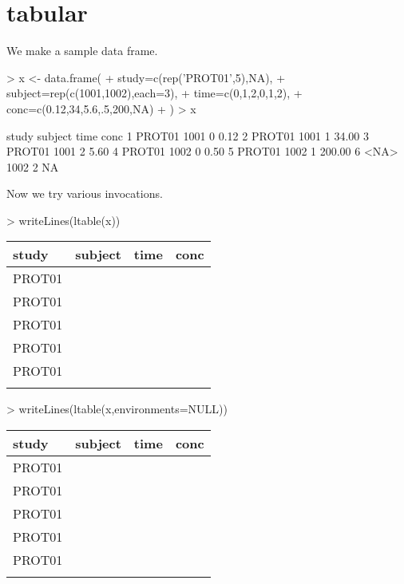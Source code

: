 \documentclass[titlepage]{article}
\begin{document}

\section*{tabular}
We make a sample data frame.
\begin{Schunk}
\begin{Sinput}
> x <- data.frame(
+   study=c(rep('PROT01',5),NA),
+   subject=rep(c(1001,1002),each=3),
+   time=c(0,1,2,0,1,2),
+   conc=c(0.12,34,5.6,.5,200,NA)
+ )
> x
\end{Sinput}
\begin{Soutput}
   study subject time   conc
1 PROT01    1001    0   0.12
2 PROT01    1001    1  34.00
3 PROT01    1001    2   5.60
4 PROT01    1002    0   0.50
5 PROT01    1002    1 200.00
6   <NA>    1002    2     NA
\end{Soutput}
\end{Schunk}
Now we try various invocations.
\begin{Schunk}
\begin{Sinput}
> writeLines(ltable(x))
\end{Sinput}
\begin{table}[!htpb]
 \begin{center}
  \begin{tabular}{lrrr}
    \hline \hline
   study & subject & time & conc \\ \hline
   PROT01 & \verb#1001# & \verb#0# & \verb#0.12# \\
   PROT01 & \verb#1001# & \verb#1# & \verb#34.00# \\
   PROT01 & \verb#1001# & \verb#2# & \verb#5.60# \\
   PROT01 & \verb#1002# & \verb#0# & \verb#0.50# \\
   PROT01 & \verb#1002# & \verb#1# & \verb#200.00# \\
    & \verb#1002# & \verb#2# & \verb## \\ \hline
  \end{tabular}
 \end{center}
\end{table}\end{Schunk}
\begin{Schunk}
\begin{Sinput}
> writeLines(ltable(x,environments=NULL))
\end{Sinput}
\begin{table}[!htpb]
 \begin{tabular}{lrrr}
   \hline \hline
  study & subject & time & conc \\ \hline
  PROT01 & \verb#1001# & \verb#0# & \verb#0.12# \\
  PROT01 & \verb#1001# & \verb#1# & \verb#34.00# \\
  PROT01 & \verb#1001# & \verb#2# & \verb#5.60# \\
  PROT01 & \verb#1002# & \verb#0# & \verb#0.50# \\
  PROT01 & \verb#1002# & \verb#1# & \verb#200.00# \\
   & \verb#1002# & \verb#2# & \verb## \\ \hline
 \end{tabular}
\end{table}\end{Schunk}
\end{document}
